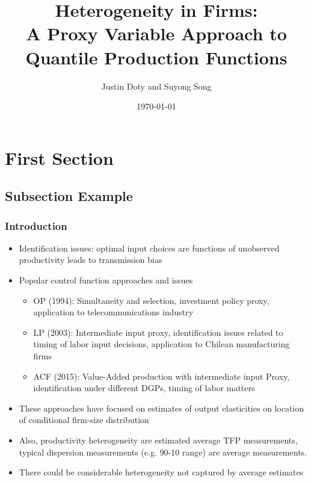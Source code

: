 \documentclass{beamer}
\title[Quantile Production Functions]{Heterogeneity in Firms:\\
A Proxy Variable Approach to Quantile Production Functions}
\author{Justin Doty and Suyong Song} %
\institute[] %
{
\\  
\medskip %
}
\date{\today} %
\begin{document}
\begin{frame}
\titlepage %
\end{frame}


\section{First Section} %

\subsection{Subsection Example} %

\begin{frame}
\frametitle{Introduction}
\begin{itemize}
\item Identification issues: optimal input choices are functions of unobserved productivity leads to transmission bias
\item Popular control function approaches and issues
\begin{itemize}
	\item OP (1994): Simultaneity and selection, investment policy proxy, application to telecommunications industry
	\item LP (2003): Intermediate input proxy, identification issues related to timing of labor input decisions, application to Chilean manufacturing firms
	\item ACF (2015): Value-Added production with intermediate input Proxy, identification under different DGPs, timing of labor matters
\end{itemize}
\item These approaches have focused on estimates of output elasticities on location of conditional firm-size distribution
\item Also, productivity heterogeneity are estimated average TFP measurements, typical dispersion measurements (e.g. 90-10 range) are average measurements.
\item There could be considerable heterogeneity not captured by average estimates

\end{itemize}
\end{frame}
\end{document}
